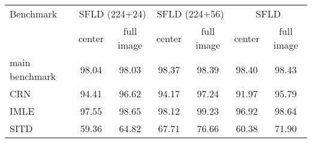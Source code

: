 \begin{tabular}{lcccccc}
\toprule
Benchmark & \multicolumn{2}{c}{SFLD (224+24)} & \multicolumn{2}{c}{SFLD (224+56)} & \multicolumn{2}{c}{SFLD} \\
\cmidrule(lr){2-3} \cmidrule(lr){4-5} \cmidrule(lr){6-7}
& center & full image & center & full image & center & full image \\
\midrule
main benchmark & 98.04 & 98.03 & 98.37 & 98.39 & 98.40 & 98.43 \\
CRN & 94.41 & 96.62 & 94.17 & 97.24 & 91.97 & 95.79 \\
IMLE & 97.55 & 98.65 & 98.12 & 99.23 & 96.92 & 98.64 \\
SITD & 59.36 & 64.82 & 67.71 & 76.66 & 60.38 & 71.90 \\
\bottomrule
\end{tabular}

